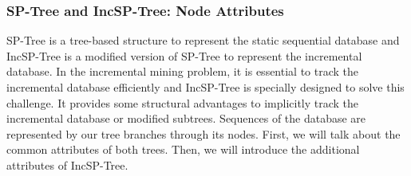 \subsubsection{SP-Tree and IncSP-Tree: Node Attributes} \label{section:node_attribute}
SP-Tree is a tree-based structure to represent the static sequential database and IncSP-Tree is a modified version of SP-Tree to represent the incremental database. In the incremental mining problem, it is essential to track the incremental database efficiently and IncSP-Tree is specially designed to solve this challenge. It provides some structural advantages to implicitly track the incremental database or modified subtrees. Sequences of the database are represented by our tree branches through its nodes. First, we will talk about the common attributes of both trees. Then, we will introduce the additional attributes of IncSP-Tree.
